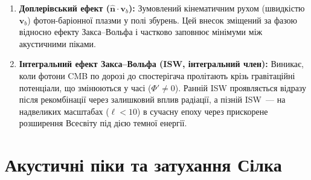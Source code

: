 \begin{enumerate}
        На суперхабблових масштабах у радіаційно-домінованій епосі
        рівняння збереження для фотонів і метричний потенціал $\Phi$
        пов'язані через рівняння Пуассона:
        $k^2\Phi \approx -4\pi G a^2 \bar\rho\,\delta$.
        У граничному випадку $k \to 0$ (масштаби значно більші за горизонт)
        розв'язок для адіабатичних початкових умов дає
        \cite{hu_sugiyama_1995}:
        \begin{equation*}
          \frac{1}{4}\delta_\gamma = -\frac{2}{3}\Phi,
        \end{equation*}
        де мінус означає, що надлишок густини фотонів ($\delta_\gamma > 0$)
        відповідає потенціальній ямі ($\Phi < 0$): плазма стиснута саме
        там, де є гравітаційний мінімум. Підставляючи у вираз для ефекту
        Закса--Вольфа:
        \begin{equation*}
          \frac{1}{4}\delta_\gamma + \Phi
          = -\frac{2}{3}\Phi + \Phi = \frac{1}{3}\Phi.
        \end{equation*}
        Знак «$+$»: фотони виходять з ями ($\Phi < 0$) і зазнають
        гравітаційного червоного зміщення, тобто виглядають
        \emph{холоднішими} (фотон витрачає свою енергію (частоту) на подолання гравітаційного потенціалу ями, «червоніє», і для зовнішнього спостерігача ця область космосу здається плямою зниженої температури.). Ефект $\frac{1}{3}\Phi < 0$ означає
        дефіцит температури у напрямку потенціальної ями~---
        саме це формує плато Закса--Вольфа на великих масштабах.
  \item \textbf{Доплерівський ефект ($\hat{\mathbf{n}} \cdot \mathbf{v}_b$):} Зумовлений кінематичним рухом (швидкістю $\mathbf{v}_b$) фотон-баріонної плазми у полі збурень. Цей внесок зміщений за фазою відносно ефекту Закса--Вольфа і частково заповнює мінімуми між акустичними піками.
  \item \textbf{Інтегральний ефект Закса--Вольфа (ISW, інтегральний член):} Виникає, коли фотони CMB по дорозі до спостерігача пролітають крізь гравітаційні потенціали, що змінюються у часі ($\Phi' \neq 0$). Ранній ISW проявляється відразу після рекомбінації через залишковий вплив радіації, а пізній ISW~--- на надвеликих масштабах ($\ell < 10$) в сучасну епоху через прискорене розширення Всесвіту під дією темної енергії.
\end{enumerate}

\section{Акустичні піки та затухання Сілка}

